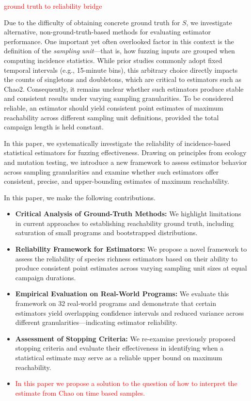 \textcolor{red}{ground truth to reliability bridge}

Due to the difficulty of obtaining concrete ground truth for $S$, we investigate alternative, non-ground-truth-based methods for evaluating estimator performance. One important yet often overlooked factor in this context is the definition of the \emph{sampling unit}—that is, how fuzzing inputs are grouped when computing incidence statistics. While prior studies commonly adopt fixed temporal intervals (e.g., 15-minute bins), this arbitrary choice directly impacts the counts of singletons and doubletons, which are critical to estimators such as Chao2. Consequently, it remains unclear whether such estimators produce stable and consistent results under varying sampling granularities. To be considered reliable, an estimator should yield consistent point estimates of maximum reachability across different sampling unit definitions, provided the total campaign length is held constant.

In this paper, we systematically investigate the reliability of incidence-based statistical estimators for fuzzing effectiveness. Drawing on principles from ecology and mutation testing, we introduce a new framework to assess estimator behavior across sampling granularities and examine whether such estimators offer consistent, precise, and upper-bounding estimates of maximum reachability. 

In this paper, we make the following contributions.

\begin{itemize}
    \item \textbf{Critical Analysis of Ground-Truth Methods:} We highlight limitations in current approaches to establishing reachability ground truth, including saturation of small programs and bootstrapped distributions.
    
    \item \textbf{Reliability Framework for Estimators:} We propose a novel framework to assess the reliability of species richness estimators based on their ability to produce consistent point estimates across varying sampling unit sizes at equal campaign durations.
    
    \item \textbf{Empirical Evaluation on Real-World Programs:} We evaluate this framework on 32 real-world programs and demonstrate that certain estimators yield overlapping confidence intervals and reduced variance across different granularities—indicating estimator reliability.
    
    \item \textbf{Assessment of Stopping Criteria:} We re-examine previously proposed stopping criteria and evaluate their effectiveness in identifying when a statistical estimate may serve as a reliable upper bound on maximum reachability.

    \item\textcolor{red}{In this paper we propose a solution to the question of how to interpret the estimate from Chao on time based samples.}
\end{itemize}

